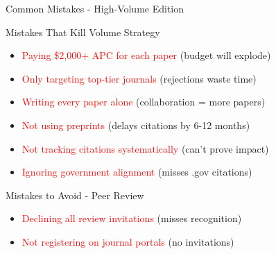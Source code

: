\documentclass[11pt]{beamer}
\begin{document}
	\begin{frame}{Common Mistakes - High-Volume Edition}
		\scriptsize
		\begin{block}{Mistakes That Kill Volume Strategy}
			\begin{itemize}
				\item \textcolor{red}{Paying \$2,000+ APC for each paper} (budget will explode)
				\item \textcolor{red}{Only targeting top-tier journals} (rejections waste time)
				\item \textcolor{red}{Writing every paper alone} (collaboration = more papers)
				\item \textcolor{red}{Not using preprints} (delays citations by 6-12 months)
				\item \textcolor{red}{Not tracking citations systematically} (can't prove impact)
				\item \textcolor{red}{Ignoring government alignment} (misses .gov citations)
			\end{itemize}
		\end{block}
		\begin{block}{Mistakes to Avoid - Peer Review}
			\begin{itemize}
				\item \textcolor{red}{Declining all review invitations} (misses recognition)
				\item \textcolor{red}{Not registering on journal portals} (no invitations)
			\end{itemize}
		\end{block}
	\end{frame}
	
\end{document}
